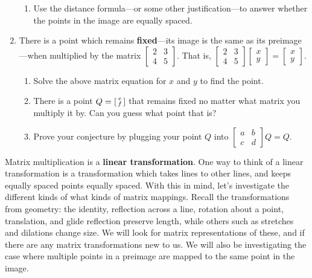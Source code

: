 \documentclass[../gatm.tex]{subfiles}
\begin{document}
\begin{enumerate}
\begin{enumerate}
\item Use the distance formula---or some other justification---to answer whether the points in the image are equally spaced.
\end{enumerate}
\item There is a point which remains \textbf{fixed}---its image is the same as its preimage---when multiplied by the matrix $\left[\begin{array}{cc}2 & 3 \\ 4 & 5 \end{array}\right]$. That is, $\left[\begin{array}{cc}2 & 3 \\ 4 & 5 \end{array}\right]\left[\begin{array}{c} x \\ y \end{array}\right]=\left[\begin{array}{c} x \\ y \end{array}\right]$.
\begin{enumerate}
\item Solve the above matrix equation for $x$ and $y$ to find the point.
\item There is a point $Q=\begin{bsmallmatrix}e \\ f \end{bsmallmatrix}$ that remains fixed no matter what matrix you multiply it by. Can you guess what point that is?
\item Prove your conjecture by plugging your point $Q$ into $\left[\begin{array}{cc}a & b \\ c & d\end{array}\right]Q=Q$.
\end{enumerate}
\setcounter{mp_problem_i}{\value{enumi}}
\end{enumerate}

\noindent Matrix multiplication is a \textbf{linear transformation}. One way to think of a linear transformation is a transformation which takes lines to other lines, and keeps equally spaced points equally spaced. With this in mind, let's investigate the different kinds of what kinds of matrix mappings. Recall the transformations from geometry: the identity, reflection across a line, rotation about a point, translation, and glide reflection preserve length, while others such as stretches and dilations change size. We will look for matrix representations of these, and if there are any matrix transformations new to us. We will also be investigating the case where multiple points in a preimage are mapped to the same point in the image.
\end{document}
